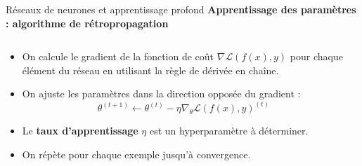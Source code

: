 \documentclass[french]{beamer}
\begin{document}
\begin{frame}{Réseaux de neurones et apprentissage profond}
\textbf{Apprentissage des paramètres : algorithme de rétropropagation}
\begin{columns}[T]
\begin{column}{.52\textwidth}
{\small
\begin{itemize}
	\item On calcule le gradient de la fonction de coût $\nabla \mathcal{L}(f(x), y)$ pour chaque élément du réseau en utilisant la règle de dérivée en chaîne.
	\item On ajuste les paramètres dans la direction opposée du gradient : \\ $$ \theta^{(t+1)} \leftarrow \theta^{(t)} - \eta \nabla_{\theta}\mathcal{L}(f(x), y)^{(t)} $$
	\item Le \textbf{taux d'apprentissage} $\eta$ est un hyperparamètre à déterminer.
	\item On répète pour chaque exemple jusqu'à convergence.
\end{itemize}
}
\end{column}
\hfill
\begin{column}{.52\textwidth}

\end{column}
\end{columns}
\end{frame}
\end{document}
